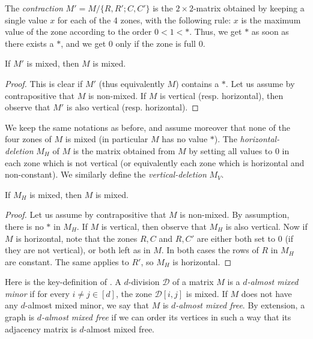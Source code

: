 The \emph{contraction} $M'=M/\{R,R';C,C'\}$ is the $2\times 2$-matrix obtained by keeping a single value $x$ for each of the 4 zones, with the following rule: $x$ is the maximum value of the zone according to the order $0<1<*$. Thus, we get $*$ as soon as there exists a $*$, and we get $0$ only if the zone is full $0$.

\begin{lemma}\label{lem:contract}
If $M'$ is mixed, then $M$ is mixed.
\end{lemma}

\begin{proof}
This is clear if $M'$ (thus equivalently $M$) contains a $*$. Let us assume by contrapositive that $M$ is non-mixed. If $M$ is vertical (resp. horizontal), then observe that $M'$ is also vertical (resp. horizontal).
\end{proof}
 
 We keep the same notations as before, and assume moreover that none of the four zones of $M$ is mixed (in particular $M$ has no value $*$). The \emph{horizontal-deletion} $M_H$ of $M$ is the matrix obtained from $M$ by setting all values to 0 in each zone which is not vertical (or equivalently each zone which is horizontal and non-constant). We similarly define the \emph{vertical-deletion} $M_V$.
 
\begin{lemma} \label{lem:deletion}
If $M_H$ is mixed, then $M$ is mixed.
\end{lemma}

\begin{proof}
 Let us assume by contrapositive that $M$ is non-mixed. By assumption, there is no $*$ in  $M_H$. If $M$ is vertical, then observe that $M_H$ is also vertical. Now if $M$ is horizontal, note that the zones $R,C$ and $R,C'$ are either both set to 0 (if they are not vertical), or both left as in $M$. In both cases the rows of $R$ in $M_H$ are constant. The same applies to $R'$, so $M_H$ is horizontal. 
\end{proof}


Here is the key-definition of \cite{PS22}.   A $d$-division $\mathcal{D}$ of a matrix $M$ is a \emph{$d$-almost mixed minor} if for every $i \neq j \in [d]$, the zone $\mathcal{D}[i, j]$ is mixed. If $M$ does not have any $d$-almost mixed minor, we say that $M$ is \emph{$d$-almost mixed free}. By extension, a graph is \emph{$d$-almost mixed free} if we can order its vertices in such a way that its adjacency matrix is $d$-almost mixed free.

